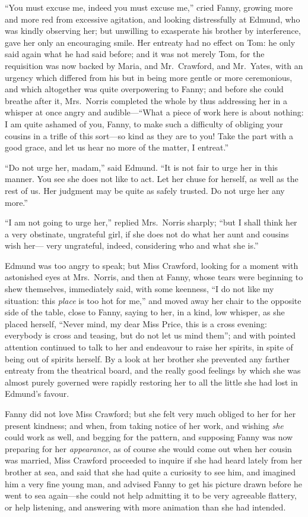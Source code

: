 \documentclass{article}
\begin{document}
``You must excuse me, indeed you must excuse me,'' cried Fanny,
growing more and more red from excessive agitation,
and looking distressfully at Edmund, who was kindly
observing her; but unwilling to exasperate his brother
by interference, gave her only an encouraging smile.
Her entreaty had no effect on Tom:  he only said again
what he had said before; and it was not merely Tom,
for the requisition was now backed by Maria, and Mr.\ Crawford,
and Mr.\ Yates, with an urgency which differed from
his but in being more gentle or more ceremonious,
and which altogether was quite overpowering to Fanny;
and before she could breathe after it, Mrs.\ Norris completed
the whole by thus addressing her in a whisper at once angry
and audible---``What a piece of work here is about nothing:
I am quite ashamed of you, Fanny, to make such a difficulty
of obliging your cousins in a trifle of this sort---so kind
as they are to you!  Take the part with a good grace,
and let us hear no more of the matter, I entreat.''

``Do not urge her, madam,'' said Edmund.  ``It is not fair to
urge her in this manner.  You see she does not like to act.
Let her chuse for herself, as well as the rest of us.
Her judgment may be quite as safely trusted.  Do not urge
her any more.''

``I am not going to urge her,'' replied Mrs.\ Norris sharply;
``but I shall think her a very obstinate, ungrateful girl,
if she does not do what her aunt and cousins wish her---%
very ungrateful, indeed, considering who and what she is.''

Edmund was too angry to speak; but Miss Crawford,
looking for a moment with astonished eyes at Mrs.\ Norris,
and then at Fanny, whose tears were beginning to shew
themselves, immediately said, with some keenness, ``I do
not like my situation:  this \emph{place} is too hot for me,''
and moved away her chair to the opposite side of the table,
close to Fanny, saying to her, in a kind, low whisper,
as she placed herself, ``Never mind, my dear Miss Price,
this is a cross evening:  everybody is cross and teasing,
but do not let us mind them''; and with pointed attention
continued to talk to her and endeavour to raise her spirits,
in spite of being out of spirits herself.  By a look at
her brother she prevented any farther entreaty from the
theatrical board, and the really good feelings by which she
was almost purely governed were rapidly restoring her
to all the little she had lost in Edmund's favour.

Fanny did not love Miss Crawford; but she felt very much
obliged to her for her present kindness; and when,
from taking notice of her work, and wishing \emph{she} could
work as well, and begging for the pattern, and supposing
Fanny was now preparing for her \emph{appearance}, as of
course she would come out when her cousin was married,
Miss Crawford proceeded to inquire if she had heard lately
from her brother at sea, and said that she had quite
a curiosity to see him, and imagined him a very fine
young man, and advised Fanny to get his picture drawn
before he went to sea again---she could not help admitting
it to be very agreeable flattery, or help listening,
and answering with more animation than she had intended.
\end{document}
